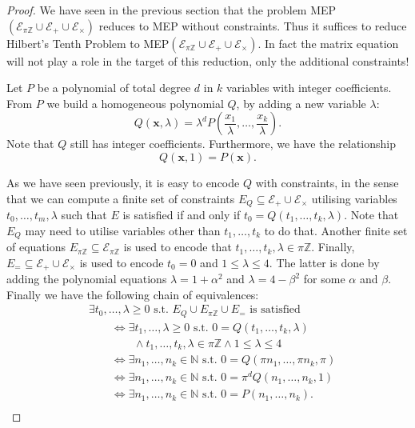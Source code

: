 \documentclass[format=acmsmall, review=false, screen=true]{acmart}
\newcommand{\Integers}{\mathbb{Z}}
\newcommand{\Naturals}{\mathbb{N}}
\begin{document}
\begin{proof}
  We have seen in the previous section that the problem
  MEP$(\mathcal{E}_{\pi\Integers}\cup\mathcal{E}_{+}\cup\mathcal{E}_{\times})$
  reduces to MEP without constraints.  Thus it suffices to reduce
  Hilbert's Tenth Problem to
  MEP$(\mathcal{E}_{\pi\Integers}\cup\mathcal{E}_{+}\cup\mathcal{E}_{\times})$.
  In fact the matrix equation will not play a role in the
  target of this reduction, only the additional constraints!

  Let $P$ be a polynomial of total degree $d$ in $k$ variables with
  integer coefficients. From $P$ we build a homogeneous polynomial $Q$, by
  adding a new variable $\lambda$:
  \[Q(\mathbf{x},\lambda)=\lambda^{d}P\left(\frac{x_1}{\lambda},\ldots,
    \frac{x_k}{\lambda}\right).\]
  Note that $Q$ still has integer coefficients. Furthermore, we have the relationship
\[Q(\mathbf{x},1)=P(\mathbf{x}).\]

As we have seen previously, it is easy to encode $Q$ with constraints,
in the sense that we can compute a finite set of constraints
$E_Q \subseteq \mathcal{E}_{+}\cup\mathcal{E}_{\times}$ utilising variables
$t_0,\ldots,t_m,\lambda$
such that $E$ is
satisfied if and only if $t_0=Q(t_1,\ldots,t_k,\lambda)$. Note that
$E_Q$ may need to utilise variables other
than $t_1,\ldots,t_k$ to do that.  Another
finite set of equations
$E_{\pi\Integers}\subseteq\mathcal{E}_{\pi\Integers}$ is used to
encode that $t_1,\ldots,t_k,\lambda\in\pi\Integers$. Finally,
$E_{=}\subseteq\mathcal{E}_{+}\cup\mathcal{E}_{\times}$ is used to
encode $t_{0}=0$ and $1\leqslant \lambda\leqslant4$.  The
latter is done by adding the polynomial equations $\lambda=1+\alpha^2$ and
$\lambda=4-\beta^2$ for some $\alpha$ and $\beta$. Finally we have the
following chain of equivalences:
\begin{align*}
&\exists t_0,\ldots,\lambda\geqslant0\text{ s.t. }E_Q\cup E_{\pi\Integers}\cup E_{=}\text{ is satisfied }\\
&\qquad\Leftrightarrow\exists t_1,\ldots,\lambda\geqslant0\text{ s.t. } 0=Q(t_1,\ldots,t_k,\lambda)\\
    &\qquad\qquad\wedge t_1,\ldots,t_k,\lambda\in\pi\Integers\wedge 1\leqslant\lambda\leqslant4\\
&\qquad\Leftrightarrow\exists n_1,\ldots,n_k\in\Naturals\text{ s.t. } 0=Q(\pi n_1,\ldots,\pi n_k,\pi)\\
&\qquad\Leftrightarrow\exists n_1,\ldots,n_k\in\Naturals\text{ s.t. } 0=\pi^{d} Q(n_1,\ldots,n_k,1)\\
&\qquad\Leftrightarrow\exists n_1,\ldots,n_k\in\Naturals\text{ s.t. } 0=P(n_1,\ldots,n_k).\\
\end{align*}
\end{proof}
\end{document}
